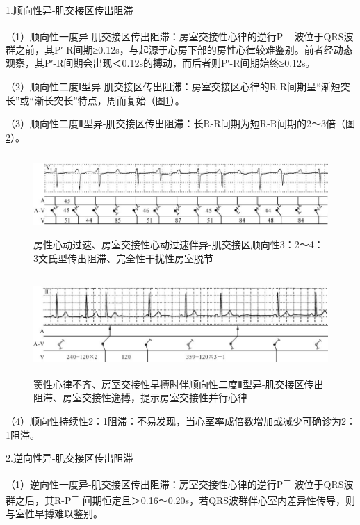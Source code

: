 1.顺向性异-肌交接区传出阻滞

（1）顺向性一度异-肌交接区传出阻滞：房室交接性心律的逆行P\textsuperscript{－}
波位于QRS波群之前，其P′-R间期≥0.12s，与起源于心房下部的房性心律较难鉴别。前者经动态观察，其P′-R间期会出现＜0.12s的搏动，而后者则P′-R间期始终≥0.12s。

（2）顺向性二度Ⅰ型异-肌交接区传出阻滞：房室交接区心律的R-R间期呈“渐短突长”或“渐长突长”特点，周而复始（图\ref{fig23-6}）。

（3）顺向性二度Ⅱ型异-肌交接区传出阻滞：长R-R间期为短R-R间期的2～3倍（图\ref{fig23-7}）。

\begin{figure}[!htbp]
 \centering
 \includegraphics[width=5.8125in,height=1.20833in]{./images/Image00390.jpg}
 \captionsetup{justification=centering}
 \caption{房性心动过速、房室交接性心动过速伴异-肌交接区顺向性3：2～4：3文氏型传出阻滞、完全性干扰性房室脱节}
 \label{fig23-6}
  \end{figure} 

\begin{figure}[!htbp]
 \centering
 \includegraphics[width=5.80208in,height=1.48958in]{./images/Image00391.jpg}
 \captionsetup{justification=centering}
 \caption{窦性心律不齐、房室交接性早搏时伴顺向性二度Ⅱ型异-肌交接区传出阻滞、房室交接性逸搏，提示房室交接性并行心律}
 \label{fig23-7}
  \end{figure} 

（4）顺向性持续性2：1阻滞：不易发现，当心室率成倍数增加或减少可确诊为2：1阻滞。

2.逆向性异-肌交接区传出阻滞

（1）逆向性一度异-肌交接区传出阻滞：房室交接性心律的逆行P\textsuperscript{－}
波位于QRS波群之后，其R-P\textsuperscript{－}
间期恒定且＞0.16～0.20s，若QRS波群伴心室内差异性传导，则与室性早搏难以鉴别。

